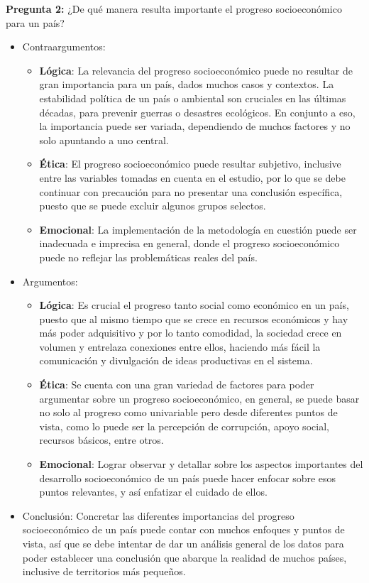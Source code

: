 \documentclass[12pt,oneside,letterpaper,spanish]{article}
\begin{document}
\newpage
\textbf{Pregunta 2:} ¿De qué manera resulta importante el progreso socioeconómico para un país?
\begin{itemize}
    \item Contraargumentos: 
    \begin{itemize}
        \item \textbf{Lógica}: La relevancia del progreso socioeconómico puede no resultar de gran importancia para un país, dados muchos casos y contextos. La estabilidad política de un país o ambiental son cruciales en las últimas décadas, para prevenir guerras o desastres ecológicos. En conjunto a eso, la importancia puede ser variada, dependiendo de muchos factores y no solo apuntando a uno central.  
        \item \textbf{Ética}: El progreso socioeconómico puede resultar subjetivo, inclusive entre las variables tomadas en cuenta en el estudio, por lo que se debe continuar con precaución para no presentar una conclusión específica, puesto que se puede excluir algunos grupos selectos.
        \item \textbf{Emocional}: La implementación de la metodología en cuestión puede ser inadecuada e imprecisa en general, donde el progreso socioeconómico puede no reflejar las problemáticas reales del país.
    \end{itemize}
    \item Argumentos:
    \begin{itemize}
        \item \textbf{Lógica}: Es crucial el progreso tanto social como económico en un país, puesto que al mismo tiempo que se crece en recursos económicos y hay más poder adquisitivo y por lo tanto comodidad, la sociedad crece en volumen y entrelaza conexiones entre ellos, haciendo más fácil la comunicación y divulgación de ideas productivas en el sistema. 
        \item \textbf{Ética}: Se cuenta con una gran variedad de factores para poder argumentar sobre un progreso socioeconómico, en general, se puede basar no solo al progreso como univariable pero desde diferentes puntos de vista, como lo puede ser la percepción de corrupción, apoyo social, recursos básicos, entre otros.
        \item \textbf{Emocional}: Lograr observar y detallar sobre los aspectos importantes del desarrollo socioeconómico de un país puede hacer enfocar sobre esos puntos relevantes, y así enfatizar el cuidado de ellos.
    \end{itemize}
    \item Conclusión: Concretar las diferentes importancias del progreso socioeconómico de un país puede contar con muchos enfoques y puntos de vista, así que se debe intentar de dar un análisis general de los datos para poder establecer una conclusión que abarque la realidad de muchos países, inclusive de territorios más pequeños.
\end{itemize}
\end{document}
